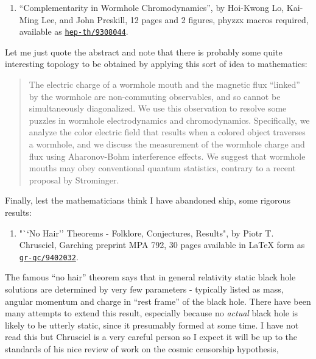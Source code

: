 \documentclass{article}
\def\tightlist{}
\begin{document}
\begin{enumerate}
\def\labelenumi{\arabic{enumi})}
\setcounter{enumi}{6}
\tightlist
\item
  ``Complementarity in Wormhole Chromodynamics'', by Hoi-Kwong Lo,
  Kai-Ming Lee, and John Preskill, 12 pages and 2 figures, phyzzx macros
  required, available as
  \href{http://xxx.lanl.gov/abs/hep-th/9308044}{\texttt{hep-th/9308044}}.
\end{enumerate}

Let me just quote the abstract and note that there is probably some
quite interesting topology to be obtained by applying this sort of idea
to mathematics:

\begin{quote}
The electric charge of a wormhole mouth and the magnetic flux ``linked''
by the wormhole are non-commuting observables, and so cannot be
simultaneously diagonalized. We use this observation to resolve some
puzzles in wormhole electrodynamics and chromodynamics. Specifically, we
analyze the color electric field that results when a colored object
traverses a wormhole, and we discuss the measurement of the wormhole
charge and flux using Aharonov-Bohm interference effects. We suggest
that wormhole mouths may obey conventional quantum statistics, contrary
to a recent proposal by Strominger.
\end{quote}

Finally, lest the mathematicians think I have abandoned ship, some
rigorous results:

\begin{enumerate}
\def\labelenumi{\arabic{enumi})}
\setcounter{enumi}{7}
\tightlist
\item
  "``No Hair'' Theorems - Folklore, Conjectures, Results", by Piotr T.
  Chrusciel, Garching preprint MPA 792, 30 pages available in LaTeX form
  as
  \href{http://xxx.lanl.gov/abs/gr-qc/9402032}{\texttt{gr-qc/9402032}}.
\end{enumerate}

The famous ``no hair'' theorem says that in general relativity static
black hole solutions are determined by very few parameters - typically
listed as mass, angular momentum and charge in ``rest frame'' of the
black hole. There have been many attempts to extend this result,
especially because no \emph{actual} black hole is likely to be utterly
static, since it presumably formed at some time. I have not read this
but Chrusciel is a very careful person so I expect it will be up to the
standards of his nice review of work on the cosmic censorship
hypothesis,
\end{document}
